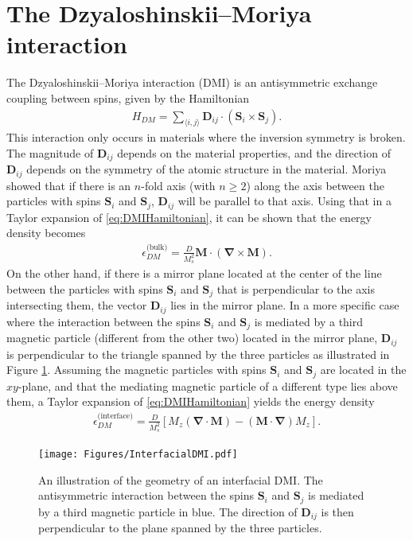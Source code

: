 \documentclass[12pt, a4paper, twoside, openright]{report}
\numberwithin{equation}{chapter}
\numberwithin{figure}{chapter}
\numberwithin{table}{chapter}
\begin{document}
\section{The Dzyaloshinskii--Moriya interaction}
The Dzyaloshinskii--Moriya interaction (DMI) is an antisymmetric exchange coupling between spins, given by the Hamiltonian
\begin{align}
H_{DM} = \sum_{\langle i,j\rangle}\mathbold{D}_{ij}\cdot(\mathbold{S}_i\times\mathbold{S}_j). \label{eq:DMIHamiltonian}
\end{align}
This interaction only occurs in materials where the inversion symmetry is broken. The magnitude of $\mathbold{D}_{ij}$ depends on the material properties, and the direction of $\mathbold{D}_{ij}$ depends on the symmetry of the atomic structure in the material. Moriya showed \cite{Moriya1960} that if there is an $n$-fold axis (with $n \geq 2$) along the axis between the particles with spins $\mathbold{S}_i$ and $\mathbold{S}_j$, $\mathbold{D}_{ij}$ will be parallel to that axis. Using that in a Taylor expansion of \eqref{eq:DMIHamiltonian}, it can be shown that the energy density becomes
\begin{align}
\epsilon_{DM}^{\textrm{(bulk)}} = \frac{D}{M_s^2}\mathbold{M}\cdot(\mathbold{\nabla}\times\mathbold{M}).
\end{align}
On the other hand, if there is a mirror plane located at the center of the line between the particles with spins $\mathbold{S}_i$ and $\mathbold{S}_j$ that is perpendicular to the axis intersecting them, the vector $\mathbold{D}_{ij}$ lies in the mirror plane. In a more specific case where the interaction between the spins $\mathbold{S}_i$ and $\mathbold{S}_j$ is mediated by a third magnetic particle (different from the other two) located in the mirror plane, $\mathbold{D}_{ij}$ is perpendicular to the triangle spanned by the three particles as illustrated in Figure \ref{fig:InterfacialDMI}. Assuming the magnetic particles with spins $\mathbold{S}_i$ and $\mathbold{S}_j$ are located in the $xy$-plane, and that the mediating magnetic particle of a different type lies above them, a Taylor expansion of \eqref{eq:DMIHamiltonian} yields the energy density
\begin{align}
\label{eq:DMInterface}
\epsilon_{DM}^{\textrm{(interface)}} = \frac{D}{M_s^2}\left[M_z(\mathbold{\nabla}\cdot\mathbold{M})-(\mathbold{M}\cdot\mathbold{\nabla})M_z\right].
\end{align}
\begin{figure}[h!]
\begin{center}
\texttt{[image: Figures/InterfacialDMI.pdf]} 
\caption{An illustration of the geometry of an interfacial DMI. The antisymmetric interaction between the spins $\mathbold{S}_i$ and $\mathbold{S}_j$ is mediated by a third magnetic particle in blue. The direction of $\mathbold{D}_{ij}$ is then perpendicular to the plane spanned by the three particles.}
\label{fig:InterfacialDMI} 
\end{center}
\end{figure}
\end{document}
